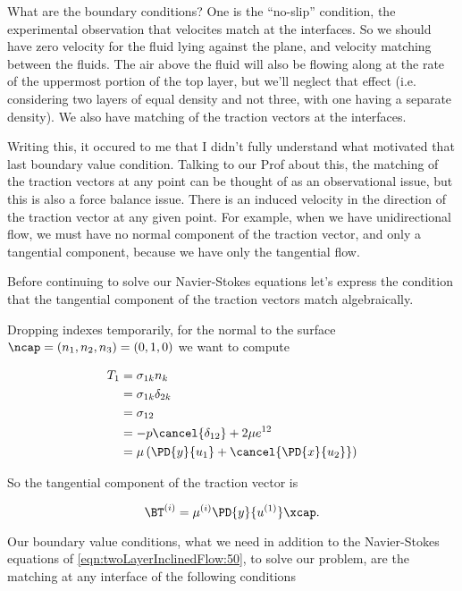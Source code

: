 What are the boundary conditions?  One is the ``no-slip'' condition, the experimental observation that velocites match at the interfaces.  So we should have zero velocity for the fluid lying against the plane, and velocity matching between the fluids.  The air above the fluid will also be flowing along at the rate of the uppermost portion of the top layer, but we'll neglect that effect (i.e. considering two layers of equal density and not three, with one having a separate density).  We also have matching of the traction vectors at the interfaces.  

Writing this, it occured to me that I didn't fully understand what motivated that last boundary value condition.  Talking to our Prof about this, the matching of the traction vectors at any point can be thought of as an observational issue, but this is also a force balance issue.  There is an induced velocity in the direction of the traction vector at any given point.  For example, when we have unidirectional flow, we must have no normal component of the traction vector, and only a tangential component, because we have only the tangential flow.

Before continuing to solve our Navier-Stokes equations let's express the condition that the tangential component of the traction vectors match algebraically.

Dropping indexes temporarily, for the normal to the surface $\ncap = (n_1, n_2, n_3) = (0, 1, 0)$ we want to compute

\begin{align*}
T_1 
&= \sigma_{1 k} n_k \\
&= \sigma_{1 k} \delta_{2 k} \\
&= \sigma_{1 2} \\
&= -p \cancel{\delta_{1 2}} + 2 \mu e^{1 2} \\
&= \mu \left( \PD{y}{u_1} + \cancel{\PD{x}{u_2}} \right) 
\end{align*}

So the tangential component of the traction vector is

\begin{equation}\label{eqn:twoLayerInclinedFlow:90}
\BT^{(i)} = \mu^{(i)} \PD{y}{u^{(1)}} \xcap.
\end{equation}

Our boundary value conditions, what we need in addition to the Navier-Stokes equations of \ref{eqn:twoLayerInclinedFlow:50}, to solve our problem, are the matching at any interface of the following conditions

